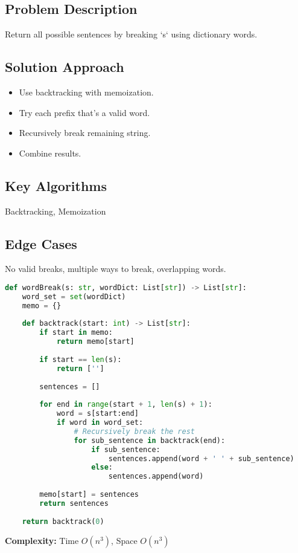 \documentclass[10pt, a4paper]{article}
\begin{document}
\subsection*{Problem Description}
Return all possible sentences by breaking `s` using dictionary words.

\subsection*{Solution Approach}
\begin{itemize}
    \item Use backtracking with memoization.
    \item Try each prefix that's a valid word.
    \item Recursively break remaining string.
    \item Combine results.
\end{itemize}

\subsection*{Key Algorithms}
Backtracking, Memoization

\subsection*{Edge Cases}
No valid breaks, multiple ways to break, overlapping words.

\begin{lstlisting}[language=Python]
def wordBreak(s: str, wordDict: List[str]) -> List[str]:
    word_set = set(wordDict)
    memo = {}
    
    def backtrack(start: int) -> List[str]:
        if start in memo:
            return memo[start]
        
        if start == len(s):
            return ['']
        
        sentences = []
        
        for end in range(start + 1, len(s) + 1):
            word = s[start:end]
            if word in word_set:
                # Recursively break the rest
                for sub_sentence in backtrack(end):
                    if sub_sentence:
                        sentences.append(word + ' ' + sub_sentence)
                    else:
                        sentences.append(word)
        
        memo[start] = sentences
        return sentences
    
    return backtrack(0)
\end{lstlisting}
\textbf{Complexity:} Time $O(n^3)$, Space $O(n^3)$
\end{document}
